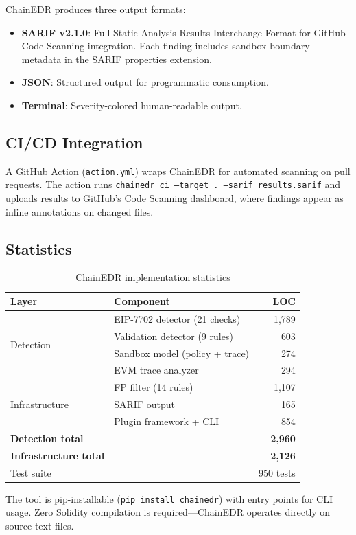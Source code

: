ChainEDR produces three output formats:
\begin{itemize}
    \item \textbf{SARIF v2.1.0}: Full Static Analysis Results Interchange Format for GitHub Code Scanning integration. Each finding includes sandbox boundary metadata in the SARIF properties extension.
    \item \textbf{JSON}: Structured output for programmatic consumption.
    \item \textbf{Terminal}: Severity-colored human-readable output.
\end{itemize}

\subsection{CI/CD Integration}

A GitHub Action (\texttt{action.yml}) wraps ChainEDR for automated scanning on pull requests. The action runs \texttt{chainedr ci --target . --sarif results.sarif} and uploads results to GitHub's Code Scanning dashboard, where findings appear as inline annotations on changed files.

\subsection{Statistics}

\begin{table}[h]
\centering
\caption{ChainEDR implementation statistics}
\label{tab:stats}
\begin{tabular}{llr}
\hline
\textbf{Layer} & \textbf{Component} & \textbf{LOC} \\
\hline
\multirow{4}{*}{Detection}
& EIP-7702 detector (21 checks) & 1,789 \\
& Validation detector (9 rules) & 603 \\
& Sandbox model (policy + trace) & 274 \\
& EVM trace analyzer & 294 \\
\hline
\multirow{3}{*}{Infrastructure}
& FP filter (14 rules) & 1,107 \\
& SARIF output & 165 \\
& Plugin framework + CLI & 854 \\
\hline
\textbf{Detection total} & & \textbf{2,960} \\
\textbf{Infrastructure total} & & \textbf{2,126} \\
Test suite & & 950 tests \\
\hline
\end{tabular}
\end{table}

The tool is pip-installable (\texttt{pip install chainedr}) with entry points for CLI usage. Zero Solidity compilation is required---ChainEDR operates directly on source text files.
